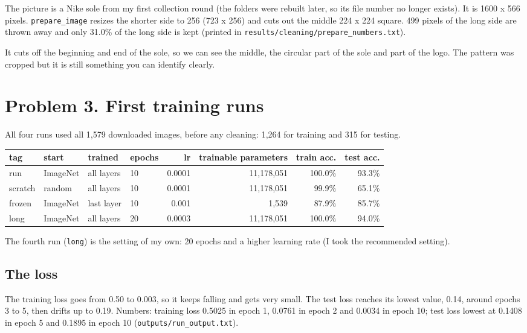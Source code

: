 \documentclass[11pt]{article}
\begin{document}
The picture is a Nike sole from my first collection round (the folders were rebuilt later, so its file number no longer exists). It is 1600 x 566 pixels. \texttt{prepare\_image} resizes the shorter side to 256 (723 x 256) and cuts out the middle 224 x 224 square. 499 pixels of the long side are thrown away and only 31.0\% of the long side is kept (printed in \texttt{results/cleaning/prepare\_numbers.txt}).

It cuts off the beginning and end of the sole, so we can see the middle, the circular part of the sole and part of the logo. The pattern was cropped but it is still something you can identify clearly.

\section*{Problem 3. First training runs}
All four runs used all 1,579 downloaded images, before any cleaning: 1,264 for training and 315 for testing.

\begin{center}\footnotesize
\begin{tabular}{llllrrrr}
\toprule
tag & start & trained & epochs & lr & trainable parameters & train acc. & test acc. \\
\midrule
run & ImageNet & all layers & 10 & 0.0001 & 11,178,051 & 100.0\% & 93.3\% \\
scratch & random & all layers & 10 & 0.0001 & 11,178,051 & 99.9\% & 65.1\% \\
frozen & ImageNet & last layer & 10 & 0.001 & 1,539 & 87.9\% & 85.7\% \\
long & ImageNet & all layers & 20 & 0.0003 & 11,178,051 & 100.0\% & 94.0\% \\
\bottomrule
\end{tabular}
\end{center}
The fourth run (\texttt{long}) is the setting of my own: 20 epochs and a higher learning rate (I took the recommended setting).


\subsection*{The loss}
The training loss goes from 0.50 to 0.003, so it keeps falling and gets very small. The test loss reaches its lowest value, 0.14, around epochs 3 to 5, then drifts up to 0.19. Numbers: training loss 0.5025 in epoch 1, 0.0761 in epoch 2 and 0.0034 in epoch 10; test loss lowest at 0.1408 in epoch 5 and 0.1895 in epoch 10 (\texttt{outputs/run\_output.txt}).
\end{document}
